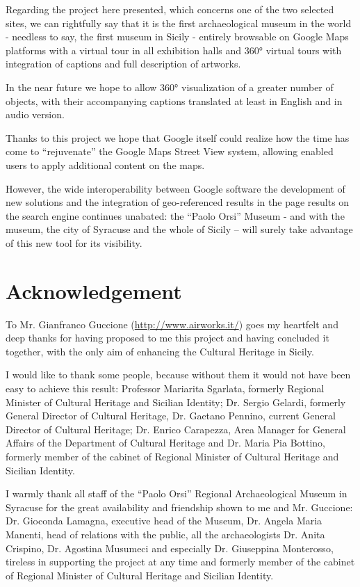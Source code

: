 \documentclass[amsthm,ebook]{saparticle}
\begin{document}
Regarding the project here presented, which concerns one of the two selected sites, we can rightfully say that it is the
first archaeological museum in the world - needless to say, the first museum in Sicily - entirely browsable on Google
Maps platforms with a virtual tour in all exhibition halls and 360° virtual tours with integration of captions and full
description of artworks.

In the near future we hope to allow 360° visualization of a greater number of objects, with their accompanying captions
translated at least in English and in audio version.

Thanks to this project we hope that Google itself could realize how the time has come to ``rejuvenate'' the Google Maps
Street View system, allowing enabled users to apply additional content on the maps.

However, the wide interoperability between Google software the development of new solutions and the integration of
geo-referenced results in the page results on the search engine continues unabated: the ``Paolo Orsi'' Museum - and with
the museum, the city of Syracuse and the whole of Sicily – will surely take advantage of this new tool for its
visibility.






\section*{Acknowledgement}


\noindent To Mr. Gianfranco Guccione (\url{http://www.airworks.it/}) goes my heartfelt and deep thanks for having proposed to me this
project and having concluded it together, with the only aim of enhancing the Cultural Heritage in Sicily.

I would like to thank some people, because without them it would not have been easy to achieve this result: Professor
Mariarita Sgarlata, formerly Regional Minister of Cultural Heritage and Sicilian Identity; Dr. Sergio Gelardi, formerly
General Director of Cultural Heritage, Dr. Gaetano Pennino, current General Director of Cultural Heritage; Dr. Enrico
Carapezza, Area Manager for General Affairs of the Department of Cultural Heritage and Dr. Maria Pia Bottino, formerly
member of the cabinet of Regional Minister of Cultural Heritage and Sicilian Identity.

I warmly thank all staff of the ``Paolo Orsi'' Regional Archaeological Museum in Syracuse for the great availability and
friendship shown to me and Mr. Guccione: Dr. Gioconda Lamagna, executive head of the Museum, Dr. Angela Maria Manenti,
head of relations with the public, all the archaeologists Dr. Anita Crispino, Dr. Agostina Musumeci and especially Dr.
Giuseppina Monterosso, tireless in supporting the project at any time and formerly member of the cabinet of Regional
Minister of Cultural Heritage and Sicilian Identity.
\end{document}
